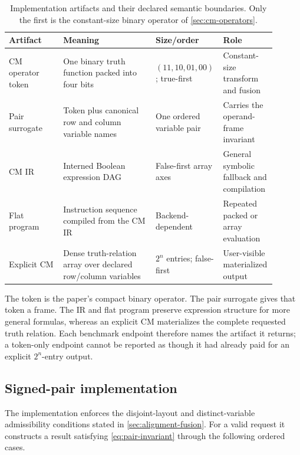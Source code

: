 \documentclass[11pt]{article}
\begin{document}
\begin{table}[H]
  \centering
  \small
  \begin{tabular}{@{}L{0.20\linewidth}L{0.34\linewidth}L{0.19\linewidth}L{0.17\linewidth}@{}}
    \toprule
    Artifact & Meaning & Size/order & Role \\
    \midrule
    CM operator token &
      One binary truth function packed into four bits &
      $(11,10,01,00)$; true-first &
      Constant-size transform and fusion \\
    Pair surrogate &
      Token plus canonical row and column variable names &
      One ordered variable pair &
      Carries the operand-frame invariant \\
    CM IR &
      Interned Boolean expression DAG &
      False-first array axes &
      General symbolic fallback and compilation \\
    Flat program &
      Instruction sequence compiled from the CM IR &
      Backend-dependent &
      Repeated packed or array evaluation \\
    Explicit CM &
      Dense truth-relation array over declared row/column variables &
      $2^n$ entries; false-first &
      User-visible materialized output \\
    \bottomrule
  \end{tabular}
  \caption{Implementation artifacts and their declared semantic boundaries.
  Only the first is the constant-size binary operator of
  \cref{sec:cm-operators}.}
  \label{tab:artifacts}
\end{table}

The token is the paper's compact binary operator. The pair surrogate gives that
token a frame. The IR and flat program preserve expression structure for more
general formulas, whereas an explicit CM materializes the complete requested
truth relation. Each benchmark endpoint therefore names the artifact it
returns; a token-only endpoint cannot be reported as though it had already
paid for an explicit $2^n$-entry output.

\subsection{Signed-pair implementation}

The implementation enforces the disjoint-layout and distinct-variable
admissibility conditions stated in \cref{sec:alignment-fusion}. For a valid
request it constructs a result satisfying \eqref{eq:pair-invariant} through
the following ordered cases.
\end{document}
